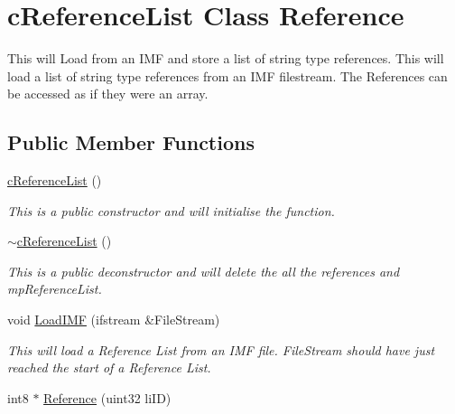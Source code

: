 \hypertarget{classc_reference_list}{
\section{cReferenceList Class Reference}
\label{classc_reference_list}
}


This will Load from an IMF and store a list of string type references. This will load a list of string type references from an IMF filestream. The References can be accessed as if they were an array.  


\subsection*{Public Member Functions}
\begin{DoxyCompactItemize}
\item 
\hypertarget{classc_reference_list_ab32c457ba5f81df31104e72401f971d0}{
\hyperlink{classc_reference_list_ab32c457ba5f81df31104e72401f971d0}{cReferenceList} ()}
\label{classc_reference_list_ab32c457ba5f81df31104e72401f971d0}

\begin{DoxyCompactList}\small\item\em This is a public constructor and will initialise the function. \end{DoxyCompactList}\item 
\hypertarget{classc_reference_list_a80fa096249122d31be380c795ed04f23}{
\hyperlink{classc_reference_list_a80fa096249122d31be380c795ed04f23}{$\sim$cReferenceList} ()}
\label{classc_reference_list_a80fa096249122d31be380c795ed04f23}

\begin{DoxyCompactList}\small\item\em This is a public deconstructor and will delete the all the references and mpReferenceList. \end{DoxyCompactList}\item 
\hypertarget{classc_reference_list_a7ef296a2936e85cc648c52401662d38d}{
void \hyperlink{classc_reference_list_a7ef296a2936e85cc648c52401662d38d}{LoadIMF} (ifstream \&FileStream)}
\label{classc_reference_list_a7ef296a2936e85cc648c52401662d38d}

\begin{DoxyCompactList}\small\item\em This will load a Reference List from an IMF file. FileStream should have just reached the start of a Reference List. \end{DoxyCompactList}\item 
\hypertarget{classc_reference_list_a5973a3c0fb616e62087d167330b720a0}{
int8 $\ast$ \hyperlink{classc_reference_list_a5973a3c0fb616e62087d167330b720a0}{Reference} (uint32 liID)}
\label{classc_reference_list_a5973a3c0fb616e62087d167330b720a0}


\end{DoxyCompactItemize}
